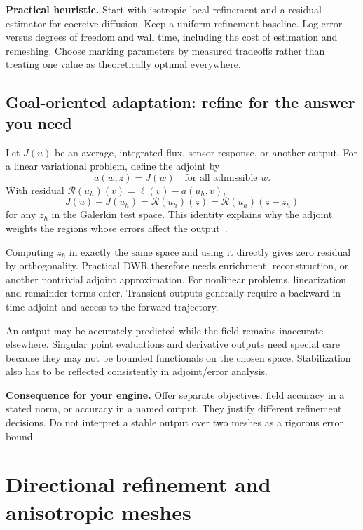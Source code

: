 \documentclass[11pt,a4paper]{article}
\newcommand{\decision}[1]{\par\smallskip\noindent\textcolor{accent}{\textbf{Consequence for your engine.}} #1\par}
\newcommand{\heuristic}{\textcolor{accent}{\textbf{Practical heuristic.}} }
\begin{document}
\heuristic Start with isotropic local refinement and a residual estimator for coercive diffusion. Keep a uniform-refinement baseline. Log error versus degrees of freedom and wall time, including the cost of estimation and remeshing. Choose marking parameters by measured tradeoffs rather than treating one value as theoretically optimal everywhere.

\subsection{Goal-oriented adaptation: refine for the answer you need}
Let $J(u)$ be an average, integrated flux, sensor response, or another output. For a linear variational problem, define the adjoint by
\begin{equation}
a(w,z)=J(w)\quad\text{for all admissible }w.
\end{equation}
With residual $\mathcal R(u_h)(v)=\ell(v)-a(u_h,v)$,
\begin{equation}\label{eq:dwr}
J(u)-J(u_h)=\mathcal R(u_h)(z)
=\mathcal R(u_h)(z-z_h)
\end{equation}
for any $z_h$ in the Galerkin test space. This identity explains why the adjoint weights the regions whose errors affect the output~\cite{becker}.

Computing $z_h$ in exactly the same space and using it directly gives zero residual by orthogonality. Practical DWR therefore needs enrichment, reconstruction, or another nontrivial adjoint approximation. For nonlinear problems, linearization and remainder terms enter. Transient outputs generally require a backward-in-time adjoint and access to the forward trajectory.

An output may be accurately predicted while the field remains inaccurate elsewhere. Singular point evaluations and derivative outputs need special care because they may not be bounded functionals on the chosen space. Stabilization also has to be reflected consistently in adjoint/error analysis.

\decision{Offer separate objectives: field accuracy in a stated norm, or accuracy in a named output. They justify different refinement decisions. Do not interpret a stable output over two meshes as a rigorous error bound.}

\section{Directional refinement and anisotropic meshes}\label{sec:anisotropy}
\end{document}
